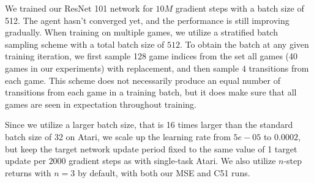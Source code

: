 We trained our ResNet 101 network for $10M$ gradient steps with a batch size of 512. The agent hasn't converged yet, and the performance is still improving gradually. When training on multiple games, we utilize a stratified batch sampling scheme with a total batch size of $512$. To obtain the batch at any given training iteration, we first sample 128 game indices from the set all games (40 games in our experiments) with replacement, and then sample $4$ transitions from each game. This scheme does not necessarily produce an equal number of transitions from each game in a training batch, but it does make sure that all games are seen in expectation throughout training.

Since we utilize a larger batch size, that is 16 times larger than the standard batch size of 32 on Atari, we scale up the learning rate from $5e-05$ to $0.0002$, but keep the target network update period fixed to the same value of 1 target update per $2000$ gradient steps as with single-task Atari. We also utilize $n$-step returns with $n=3$ by default, with both our MSE and C51 runs.

\begin{table}[t]
\small
\caption{\textbf{Hyperparameters used by multi-game training.} Here we report the key hyperparameters used by the multi-game training. The differences from standard single-game training are highlighted in red.} 
\vspace{0.05cm}
\centering
{}
\label{table:hyperparams_atari}
\end{table}


